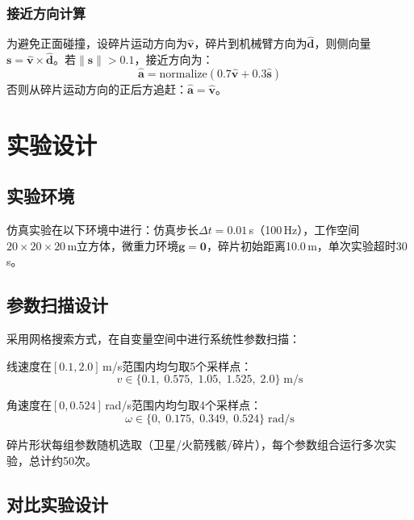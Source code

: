 \documentclass[12pt,a4paper]{ctexart}
\begin{document}
\subsubsection{接近方向计算}

为避免正面碰撞，设碎片运动方向为$\hat{\mathbf{v}}$，碎片到机械臂方向为$\hat{\mathbf{d}}$，则侧向量$\mathbf{s} = \hat{\mathbf{v}} \times \hat{\mathbf{d}}$。若$\|\mathbf{s}\| > 0.1$，接近方向为：
\begin{equation}
  \hat{\mathbf{a}} = \mathrm{normalize}(0.7\hat{\mathbf{v}} + 0.3\hat{\mathbf{s}})
\end{equation}
否则从碎片运动方向的正后方追赶：$\hat{\mathbf{a}} = \hat{\mathbf{v}}$。


\section{实验设计}

\subsection{实验环境}

仿真实验在以下环境中进行：仿真步长$\Delta t = 0.01$\,s（100\,Hz），工作空间$20 \times 20 \times 20$\,m立方体，微重力环境$\mathbf{g} = \mathbf{0}$，碎片初始距离10.0\,m，单次实验超时30\,s。

\subsection{参数扫描设计}

采用网格搜索方式，在自变量空间中进行系统性参数扫描：

线速度在$[0.1, 2.0]$\,m/s范围内均匀取5个采样点：
\begin{equation}
  v \in \{0.1,\; 0.575,\; 1.05,\; 1.525,\; 2.0\} \;\text{m/s}
\end{equation}

角速度在$[0, 0.524]$\,rad/s范围内均匀取4个采样点：
\begin{equation}
  \omega \in \{0,\; 0.175,\; 0.349,\; 0.524\} \;\text{rad/s}
\end{equation}

碎片形状每组参数随机选取（卫星/火箭残骸/碎片），每个参数组合运行多次实验，总计约50次。

\subsection{对比实验设计}
\end{document}
